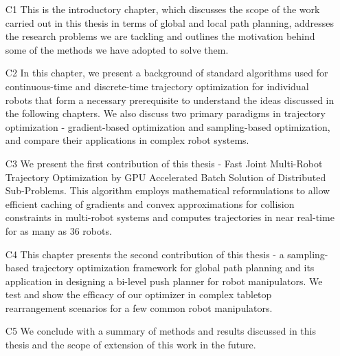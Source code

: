 \begin{itemize}
    \item[C1] This is the introductory chapter, which discusses the scope of the work carried out in this thesis in terms of global and local path planning, addresses the research problems we are tackling and outlines the motivation behind some of the methods we have adopted to solve them.
    \item[C2] In this chapter, we present a background of standard algorithms used for continuous-time and discrete-time trajectory optimization for individual robots that form a necessary prerequisite to understand the ideas discussed in the following chapters. We also discuss two primary paradigms in trajectory optimization - gradient-based optimization and sampling-based optimization, and compare their applications in complex robot systems.
    \item[C3] We present the first contribution of this thesis - Fast Joint Multi-Robot Trajectory Optimization by GPU Accelerated Batch Solution of Distributed Sub-Problems. This algorithm employs mathematical reformulations to allow efficient caching of gradients and convex approximations for collision constraints in multi-robot systems and computes trajectories in near real-time for as many as 36 robots.
    \item[C4] This chapter presents the second contribution of this thesis - a sampling-based trajectory optimization framework for global path planning and its application in designing a bi-level push planner for robot manipulators. We test and show the efficacy of our optimizer in complex tabletop rearrangement scenarios for a few common robot manipulators.
    \item[C5] We conclude with a summary of methods and results discussed in this thesis and the scope of extension of this work in the future.
\end{itemize}

